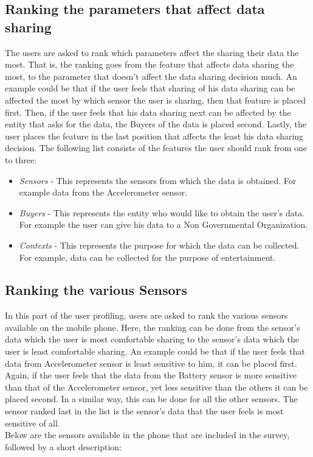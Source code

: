 
\subsection{Ranking the parameters that affect data sharing}

The users are asked to rank which parameters affect the sharing their data the most. That is,
the ranking goes from the feature that affects data sharing the most, to the parameter that doesn't affect the data sharing decision much. An example could be that if the user feels that sharing of his data sharing can be affected the most by which sensor the user is sharing, then that feature
is placed first. Then, if the user feels that his data sharing next can be affected by the entity that asks for the data, the Buyers of the data is placed second. Lastly, the user places the feature in the last position that affects the least his data sharing decision.
The following list consists of the features the user should rank from one to three:


\begin{itemize}
\item {\it Sensors} - This represents the sensors from which the data is obtained. For example data from the Accelerometer sensor.
\item {\it Buyers} - This represents the entity who would like to obtain the user's data. For example the user can give his data to a Non Governmental Organization.
\item {\it Contexts} - This represents the purpose for which the data can be collected. For example, data can be collected for the purpose of
entertainment.
\end{itemize}



\subsection{Ranking the various Sensors }

In this part of the user profiling, users are asked to rank the various sensors available on the mobile phone. Here, the ranking can be done from the sensor's data which the user is most comfortable sharing to the sensor's data which the user is least comfortable sharing. An example could be that 
if the user feels that data from Accelerometer sensor is least sensitive to him, it can be placed first. Again, if the user feels that the data from the Battery sensor is more sensitive than that of the Accelerometer sensor, yet less sensitive than the others it can be placed second. In a similar way, this can be done for all the other sensors. The sensor ranked last in the list is the sensor's data that the user feels is most sensitive of all.\\
Below are the sensors available in the phone that are included in the survey, followed by a short description:

